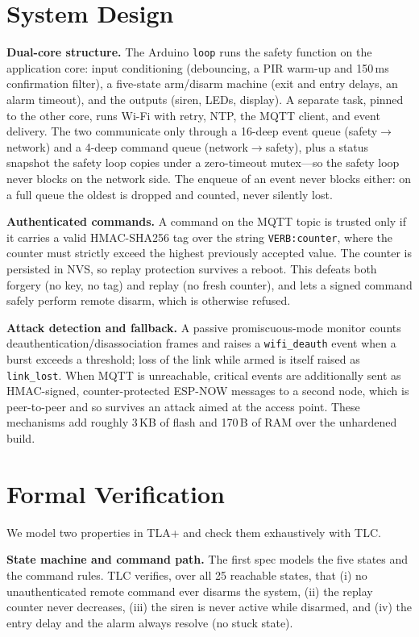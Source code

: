 \section{System Design}\label{sec:design}
\textbf{Dual-core structure.} The Arduino \texttt{loop} runs the safety function on the
application core: input conditioning (debouncing, a PIR warm-up and 150\,ms confirmation
filter), a five-state arm/disarm machine (exit and entry delays, an alarm timeout), and the
outputs (siren, LEDs, display). A separate task, pinned to the other core, runs Wi-Fi with
retry, NTP, the MQTT client, and event delivery. The two communicate only through a 16-deep
event queue (safety$\rightarrow$network) and a 4-deep command queue (network$\rightarrow$safety),
plus a status snapshot the safety loop copies under a zero-timeout mutex---so the safety loop
never blocks on the network side. The enqueue of an event never blocks either: on a full queue
the oldest is dropped and counted, never silently lost.

\textbf{Authenticated commands.} A command on the MQTT topic is trusted only if it carries a
valid HMAC-SHA256 tag over the string \texttt{VERB:counter}, where the counter must strictly
exceed the highest previously accepted value. The counter is persisted in NVS, so replay
protection survives a reboot. This defeats both forgery (no key, no tag) and replay (no fresh
counter), and lets a signed command safely perform remote disarm, which is otherwise refused.

\textbf{Attack detection and fallback.} A passive promiscuous-mode monitor counts
deauthentication/disassociation frames and raises a \texttt{wifi\_deauth} event when a burst
exceeds a threshold; loss of the link while armed is itself raised as \texttt{link\_lost}. When
MQTT is unreachable, critical events are additionally sent as HMAC-signed, counter-protected
ESP-NOW messages to a second node, which is peer-to-peer and so survives an attack aimed at the
access point. These mechanisms add roughly 3\,KB of flash and 170\,B of RAM over the
unhardened build.

\section{Formal Verification}\label{sec:formal}
We model two properties in TLA+ and check them exhaustively with TLC.

\textbf{State machine and command path.} The first spec models the five states and the command
rules. TLC verifies, over all 25 reachable states, that (i) no unauthenticated remote command
ever disarms the system, (ii) the replay counter never decreases, (iii) the siren is never
active while disarmed, and (iv) the entry delay and the alarm always resolve (no stuck state).

